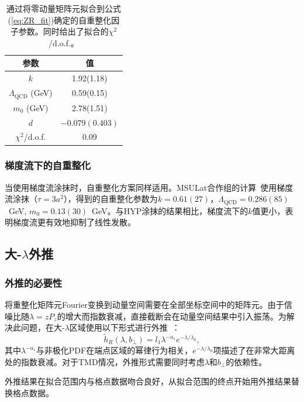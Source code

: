 \documentclass[12pt,a4paper]{ctexart}
\theoremstyle{definition}
\newcommand{\hR}{\tilde{h}_R}
\newcommand{\Pz}{P_z}
\newcommand{\QCD}{\Lambda_{\text{QCD}}}
\newcommand{\bperp}{b_\perp}
\begin{document}
\begin{table}[H]
\centering
\caption{通过将零动量矩阵元拟合到公式(\ref{eq:ZR_fit})确定的自重整化因子参数。同时给出了拟合的$\chi^2$/d.o.f.。}
\label{tab:ZRparams}
\begin{tabular}{cc}
\toprule
参数 & 值 \\
\midrule
$k$ & 1.92(1.18) \\
$\QCD$ (GeV) & 0.59(0.15) \\
$m_0$ (GeV) & 2.78(1.51) \\
$d$ & $-0.079(0.403)$ \\
$\chi^2$/d.o.f. & 0.09 \\
\bottomrule
\end{tabular}
\end{table}

\subsubsection{梯度流下的自重整化}

当使用梯度流涂抹时，自重整化方案同样适用。MSULat合作组的计算~\cite{NieMiera2025}使用梯度流涂抹（$\tau = 3a^2$），得到的自重整化参数为$k = 0.61(27)$，$\QCD = 0.286(85)$~GeV, $m_0 = 0.13(30)$~GeV。与HYP涂抹的结果相比，梯度流下的$k$值更小，表明梯度流更有效地抑制了线性发散。

\subsection{大-$\lambda$外推}

\subsubsection{外推的必要性}

将重整化矩阵元Fourier变换到动量空间需要在全部坐标空间中的矩阵元。由于信噪比随$\lambda = z\Pz$的增大而指数衰减，直接截断会在动量空间结果中引入振荡。为解决此问题，在大-$\lambda$区域使用以下形式进行外推~\cite{Ji:2020brr,Chen2025gluon}：
\begin{equation}\label{eq:lambda_extrap}
    \hR(\lambda, \bperp) = l_1 \lambda^{-a_1} e^{-\lambda/\lambda_0},
\end{equation}
其中$\lambda^{-a_1}$与非极化PDF在端点区域的幂律行为相关，$e^{-\lambda/\lambda_0}$项描述了在非常大距离处的指数衰减。对于TMD情况，外推形式需要同时考虑$\lambda$和$\bperp$的依赖性。

外推结果在拟合范围内与格点数据吻合良好，从拟合范围的终点开始用外推结果替换格点数据。
\end{document}

